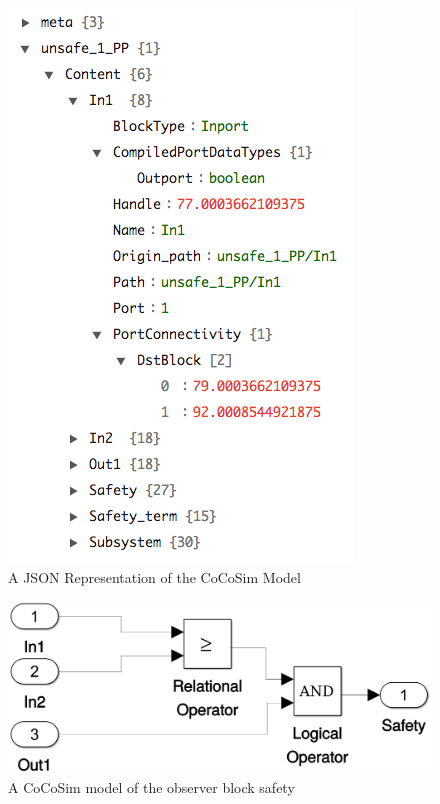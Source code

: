 \documentclass{article}
\begin{document}
\begin{figure}[h]
\begin{center}
  \includegraphics[scale=0.35]{figures/In1}
\end{center}  
  \caption{A JSON Representation of the CoCoSim Model}
  \label{jsoninport}
\end{figure}

\begin{figure}[h]
\begin{center}
  \includegraphics[scale=0.2]{figures/safety0}
\end{center}  
  \caption{A CoCoSim model of the observer block safety}
  \label{cocosimsafety}
\end{figure}
\end{document}
